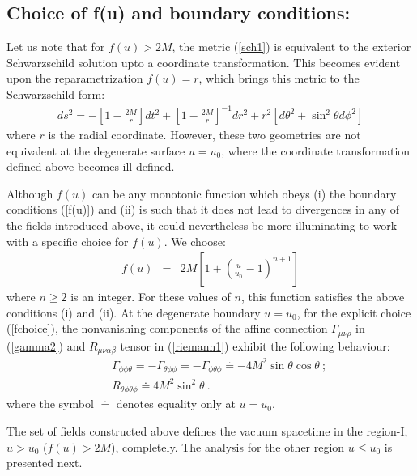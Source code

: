 \documentclass[preprint,aps,superscriptaddress,nofootinbib]{revtex4-1}
\begin{document}
\subsection*{Choice of f(u) and boundary conditions:}
Let us note that for $f(u)> 2M$, the metric (\ref{sch1}) is equivalent to the  exterior Schwarzschild solution upto a coordinate transformation. This becomes evident upon the reparametrization
$f(u)=r$, which brings this metric to the Schwarzschild form:
\begin{eqnarray}\label{sc}
ds^2=-\left[1-\frac{2M}{r}\right]dt^2 + \left[1-\frac{2M}{r}\right]^{-1} 
dr^2 + r^2\left[d\theta^2+\sin^2 \theta d\phi^2\right]
\end{eqnarray}
where $r$ is the radial coordinate. However, these two geometries are not 
equivalent at the degenerate surface $u=u_0$, where the coordinate 
transformation defined above becomes ill-defined.

Although $f(u)$ can be any monotonic function which obeys (i) the 
boundary conditions (\ref{f(u)}) and (ii) is such that it does not 
lead to divergences in any of the fields introduced above, it
could nevertheless be more illuminating to work 
with a specific choice for $f(u)$. We choose:
\begin{eqnarray}\label{fchoice}
f(u)&=&2M\left[1+\left(\frac{u}{u_0}-1\right)^{n+1}\right] \label{fchoice1}
\end{eqnarray}
where $n\geq 2$ is an integer. For these values of $n$, this function 
satisfies the above conditions (i) and (ii). At the degenerate boundary 
$u=u_0$, for the explicit choice (\ref{fchoice}), the nonvanishing 
components of the affine connection $\Gamma^{}_{\mu\nu\rho}$ 
in (\ref{gamma2})  and $R_{\mu\nu\alpha\beta}$ tensor in (\ref{riemann1})
exhibit the following behaviour:
  \begin{eqnarray}\label{R1}
&&\Gamma_{\phi\phi\theta}= -\Gamma_{\theta\phi\phi}=-\Gamma_{\phi 
\theta\phi} \doteq -4M^2\sin\theta\cos\theta~;\nonumber\\
 &&R_{\theta\phi \theta\phi}\doteq 4M^2\sin^2 \theta~.
\end{eqnarray}
where the symbol $\doteq$ denotes equality only at $u=u_0$.

The set of fields constructed above defines the vacuum spacetime in 
the region-I,  $u>u_0$ ($f(u)>2M$),  completely. The analysis 
for the other region $u\leq u_0$ is presented next.
\end{document}
